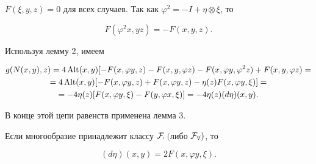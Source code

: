  


\begin{pf} 


$F(\xi,y,z)=0$ для всех случаев. Так как $\varphi 


^2=-I+\eta\otimes\xi$, то 


$$ 


F(\varphi ^2x,y z)=-F(x,y,z). 


$$ 


Используя лемму 2, имеем 


\begin{multline*} 


g(N(x,y),z)=4\Alt(x,y)[-F(x,\varphi y,z)-F(x,y,\varphi z)- 


F(x,\varphi y,\varphi ^2z)+F(x,y,\varphi z)=\\ 


=4\Alt(x,y)[-F(x,\varphi y,z)+F(x,\varphi y,z)- 


\eta(z)F(x,\varphi y,\xi)]= \\ 


=-4\eta(z)[F(x,\varphi y,\xi)-F(y,\varphi x,\xi)]= 


-4\eta(z)(d\eta)(x,y). 


\end{multline*} 


В конце этой цепи равенств применена лемма 3. 


\end{pf} 


 


\begin{lem} 


Если многообразие принадлежит классу $\cal F_7$ $($либо $\cal F_8)$, то 


$$ 


(d\eta)(x,y)=2F(x,\varphi y,\xi). 


$$ 


\end{lem} 


 



